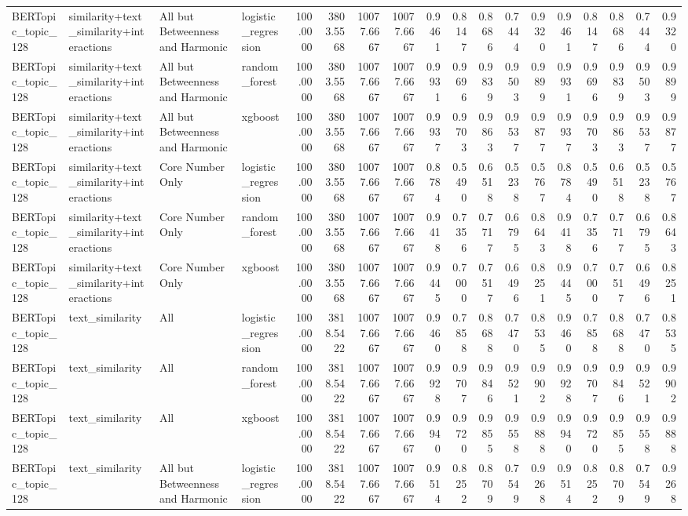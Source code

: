 \begin{tabular}{llllrrrrrrrrrrrrrr}
BERTopic_topic_128 & similarity+text_similarity+interactions & All but Betweenness and Harmonic & logistic_regression & 100.0000 & 3803.5568 & 10077.6667 & 10077.6667 & 0.9461 & 0.8147 & 0.8686 & 0.7444 & 0.9320 & 0.9461 & 0.8147 & 0.8686 & 0.7444 & 0.9320 \\
BERTopic_topic_128 & similarity+text_similarity+interactions & All but Betweenness and Harmonic & random_forest & 100.0000 & 3803.5568 & 10077.6667 & 10077.6667 & 0.9931 & 0.9696 & 0.9839 & 0.9503 & 0.9899 & 0.9931 & 0.9696 & 0.9839 & 0.9503 & 0.9899 \\
BERTopic_topic_128 & similarity+text_similarity+interactions & All but Betweenness and Harmonic & xgboost & 100.0000 & 3803.5568 & 10077.6667 & 10077.6667 & 0.9937 & 0.9703 & 0.9863 & 0.9537 & 0.9877 & 0.9937 & 0.9703 & 0.9863 & 0.9537 & 0.9877 \\
BERTopic_topic_128 & similarity+text_similarity+interactions & Core Number Only & logistic_regression & 100.0000 & 3803.5568 & 10077.6667 & 10077.6667 & 0.8784 & 0.5490 & 0.6518 & 0.5238 & 0.5767 & 0.8784 & 0.5490 & 0.6518 & 0.5238 & 0.5767 \\
BERTopic_topic_128 & similarity+text_similarity+interactions & Core Number Only & random_forest & 100.0000 & 3803.5568 & 10077.6667 & 10077.6667 & 0.9418 & 0.7356 & 0.7717 & 0.6795 & 0.8643 & 0.9418 & 0.7356 & 0.7717 & 0.6795 & 0.8643 \\
BERTopic_topic_128 & similarity+text_similarity+interactions & Core Number Only & xgboost & 100.0000 & 3803.5568 & 10077.6667 & 10077.6667 & 0.9445 & 0.7000 & 0.7517 & 0.6496 & 0.8251 & 0.9445 & 0.7000 & 0.7517 & 0.6496 & 0.8251 \\
BERTopic_topic_128 & text_similarity & All & logistic_regression & 100.0000 & 3818.5422 & 10077.6667 & 10077.6667 & 0.9460 & 0.7858 & 0.8688 & 0.7470 & 0.8535 & 0.9460 & 0.7858 & 0.8688 & 0.7470 & 0.8535 \\
BERTopic_topic_128 & text_similarity & All & random_forest & 100.0000 & 3818.5422 & 10077.6667 & 10077.6667 & 0.9928 & 0.9707 & 0.9846 & 0.9521 & 0.9902 & 0.9928 & 0.9707 & 0.9846 & 0.9521 & 0.9902 \\
BERTopic_topic_128 & text_similarity & All & xgboost & 100.0000 & 3818.5422 & 10077.6667 & 10077.6667 & 0.9940 & 0.9720 & 0.9855 & 0.9558 & 0.9888 & 0.9940 & 0.9720 & 0.9855 & 0.9558 & 0.9888 \\
BERTopic_topic_128 & text_similarity & All but Betweenness and Harmonic & logistic_regression & 100.0000 & 3818.5422 & 10077.6667 & 10077.6667 & 0.9514 & 0.8252 & 0.8709 & 0.7549 & 0.9268 & 0.9514 & 0.8252 & 0.8709 & 0.7549 & 0.9268 \\

\end{tabular}
